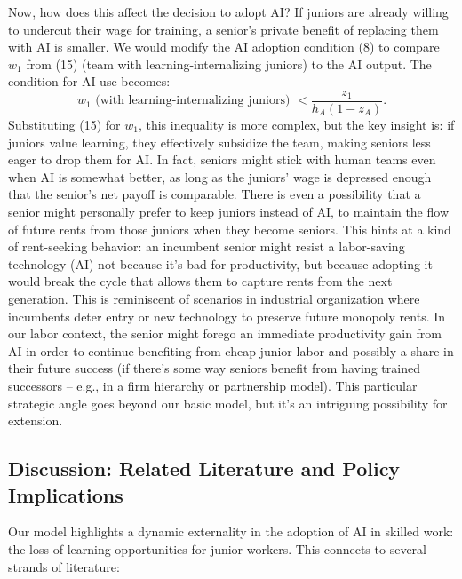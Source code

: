\documentclass[12pt]{article}
\begin{document}
Now, how does this affect the decision to adopt AI? If juniors are
already willing to undercut their wage for training, a senior's private
benefit of replacing them with AI is smaller. We would modify the
{AI adoption condition} (8) to compare \(w_1\) from (15) (team
with learning-internalizing juniors) to the AI output. The condition for
AI use becomes: 
\begin{equation}
w_1 \text{ (with learning-internalizing juniors) }
<{} \frac{z_1}{h_A(1-z_A)}. \tag{16}
\end{equation}
Substituting (15) for
\(w_1\), this inequality is more complex, but the key insight is:
{if juniors value learning, they effectively subsidize the team,
making seniors less eager to drop them for AI}. In fact, seniors might
stick with human teams even when AI is somewhat better, as long as the
juniors' wage is depressed enough that the senior's net payoff is
comparable. There is even a possibility that a {senior might
{personally prefer} to keep juniors instead of AI}, to maintain the
flow of future rents from those juniors when they become seniors. This
hints at a kind of {rent-seeking behavior}: an incumbent senior
might resist a labor-saving technology (AI) not because it's bad for
productivity, but because adopting it would break the cycle that allows
them to capture rents from the next generation. This is reminiscent of
scenarios in industrial organization where incumbents deter entry or new
technology to preserve future monopoly rents. In our labor context, the
senior might forego an immediate productivity gain from AI in order to
continue benefiting from cheap junior labor and possibly a share in
their future success (if there's some way seniors benefit from having
trained successors -- e.g., in a firm hierarchy or partnership model).
This particular strategic angle goes beyond our basic model, but it's an
intriguing possibility for extension.

\subsection{Discussion: Related Literature and Policy
Implications}\label{discussion-related-literature-and-policy-implications}

Our model highlights a {dynamic externality} in the adoption of
AI in skilled work: the loss of learning opportunities for junior
workers. This connects to several strands of literature:
\end{document}
